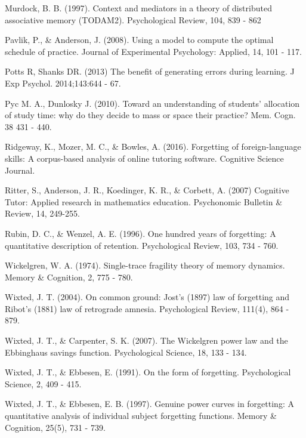 \documentclass[a4paper,12pt]{article}
\begin{document}
\begin{hangparas}{.25in}{1}
Murdock, B. B. (1997). Context and mediators in a theory of distributed associative memory (TODAM2). Psychological Review, 104, 839 - 862

Pavlik, P., \& Anderson, J. (2008). Using a model to compute the optimal schedule of practice. Journal of Experimental Psychology: Applied, 14, 101 - 117.

Potts R, Shanks DR. (2013) The benefit of generating errors during learning. J Exp Psychol. 2014;143:644 - 67.

Pyc M. A., Dunlosky J. (2010). Toward an understanding of students' allocation of study time: why do they decide to mass or space their practice? Mem. Cogn. 38 431 - 440. 

Ridgeway, K., Mozer, M. C., \& Bowles, A. (2016). Forgetting of foreign-language skills: A corpus-based analysis of online tutoring software. Cognitive Science Journal.

Ritter, S., Anderson, J. R., Koedinger, K. R., \& Corbett, A. (2007) Cognitive Tutor: Applied research in mathematics education. Psychonomic Bulletin \& Review, 14, 249-255.

Rubin, D. C., \& Wenzel, A. E. (1996). One hundred years of forgetting: A quantitative description of retention. Psychological Review, 103, 734 - 760. 

Wickelgren, W. A. (1974). Single-trace fragility theory of memory dynamics. Memory \& Cognition, 2, 775 - 780. 

Wixted, J. T. (2004). On common ground: Jost's (1897) law of forgetting and Ribot's (1881) law of retrograde amnesia. Psychological Review, 111(4), 864 - 879. 

Wixted, J. T., \& Carpenter, S. K. (2007). The Wickelgren power law and the Ebbinghaus savings function. Psychological Science, 18, 133 - 134. 

Wixted, J. T., \& Ebbesen, E. (1991). On the form of forgetting. Psychological Science, 2, 409 - 415. 

Wixted, J. T., \& Ebbesen, E. B. (1997). Genuine power curves in forgetting: A quantitative analysis of individual subject forgetting functions. Memory \& Cognition, 25(5), 731 - 739.
\end{hangparas}
\end{document}
